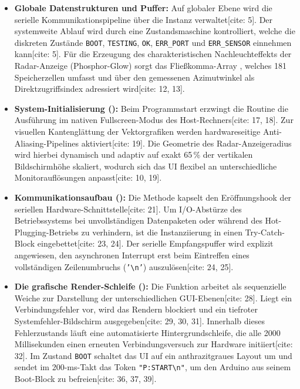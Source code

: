 \begin{itemize}
	\item \textbf{Globale Datenstrukturen und Puffer:} Auf globaler Ebene wird die serielle Kommunikationspipeline über die Instanz  verwaltet[cite: 5]. Der systemweite Ablauf wird durch eine Zustandsmaschine kontrolliert, welche die diskreten Zustände \texttt{BOOT}, \texttt{TESTING}, \texttt{OK}, \texttt{ERR\_PORT} und \texttt{ERR\_SENSOR} einnehmen kann[cite: 5]. Für die Erzeugung des charakteristischen Nachleuchteffekts der Radar-Anzeige (Phosphor-Glow) sorgt das Fließkomma-Array , welches 181 Speicherzellen umfasst und über den gemessenen Azimutwinkel als Direktzugriffsindex adressiert wird[cite: 12, 13].
	\item \textbf{System-Initialisierung ():} Beim Programmstart erzwingt die Routine  die Ausführung im nativen Fullscreen-Modus des Host-Rechners[cite: 17, 18]. Zur visuellen Kantenglättung der Vektorgrafiken werden hardwareseitige Anti-Aliasing-Pipelines aktiviert[cite: 19]. Die Geometrie des Radar-Anzeigeradius wird hierbei dynamisch und adaptiv auf exakt 65\,\% der vertikalen Bildschirmhöhe skaliert, wodurch sich das UI flexibel an unterschiedliche Monitorauflösungen anpasst[cite: 10, 19].
	\item \textbf{Kommunikationsaufbau ():} Die Methode kapselt den Eröffnungshook der seriellen Hardware-Schnittstelle[cite: 21]. Um I/O-Abstürze des Betriebssystems bei unvollständigen Datenpaketen oder während des Hot-Plugging-Betriebs zu verhindern, ist die Instanziierung in einen Try-Catch-Block eingebettet[cite: 23, 24]. Der serielle Empfangspuffer wird explizit angewiesen, den asynchronen Interrupt erst beim Eintreffen eines vollständigen Zeilenumbruchs (\texttt{'\textbackslash n'}) auszulösen[cite: 24, 25].
	\item \textbf{Die grafische Render-Schleife ():} Die Funktion  arbeitet als sequenzielle Weiche zur Darstellung der unterschiedlichen GUI-Ebenen[cite: 28]. Liegt ein Verbindungsfehler vor, wird das Rendern blockiert und ein tiefroter Systemfehler-Bildschirm ausgegeben[cite: 29, 30, 31]. Innerhalb dieses Fehlerzustands läuft eine automatisierte Hintergrundschleife, die alle 2000 Millisekunden einen erneuten Verbindungsversuch zur Hardware initiiert[cite: 32]. Im Zustand \texttt{BOOT} schaltet das UI auf ein anthrazitgraues Layout um und sendet im 200-ms-Takt das Token \texttt{"P:START\textbackslash n"}, um den Arduino aus seinem Boot-Block zu befreien[cite: 36, 37, 39]. 

\end{itemize}

